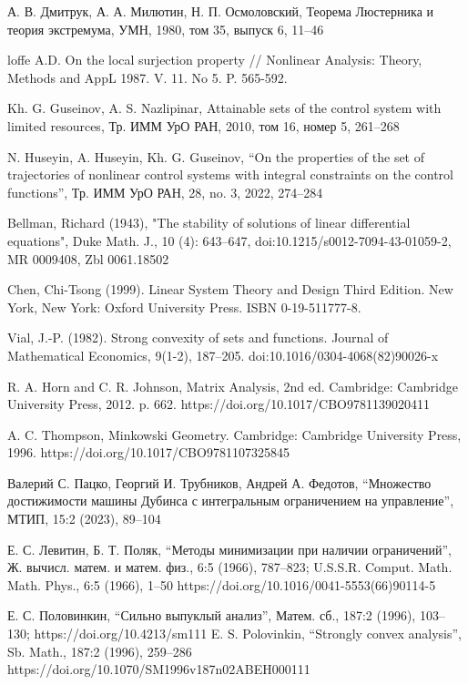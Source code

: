 \documentclass[../main.tex]{subfiles}
\begin{document}
\begin{thebibliography}{99}
А. В. Дмитрук, А. А. Милютин, Н. П. Осмоловский, Теорема Люстерника и теория экстремума, УМН, 1980, том 35, выпуск 6, 11–46

loffe A.D. On the local surjection property // Nonlinear Analysis: Theory, Methods and AppL 1987. V. 11. No 5. P. 565-592.

Kh. G. Guseinov, A. S. Nazlipinar, Attainable sets of the control system with limited resources, Тр. ИММ УрО РАН, 2010, том 16, номер 5, 261–268

N. Huseyin, A. Huseyin, Kh. G. Guseinov, “On the properties of the set of trajectories of nonlinear control systems with integral constraints on the control functions”, Тр. ИММ УрО РАН, 28, no. 3, 2022, 274–284

 Bellman, Richard (1943), "The stability of solutions of linear differential equations", Duke Math. J., 10 (4): 643–647, doi:10.1215/s0012-7094-43-01059-2, MR 0009408, Zbl 0061.18502
 
Chen, Chi-Tsong (1999). Linear System Theory and Design Third Edition. New York, New York: Oxford University Press. ISBN 0-19-511777-8.

Vial, J.-P. (1982). Strong convexity of sets and functions. Journal of Mathematical Economics, 9(1-2), 187–205. doi:10.1016/0304-4068(82)90026-x

 R. A. Horn and C. R. Johnson, Matrix Analysis, 2nd ed. Cambridge: Cambridge University Press, 2012. p. 662. https://doi.org/10.1017/CBO9781139020411
 
 A. C. Thompson, Minkowski Geometry. Cambridge: Cambridge University Press, 1996. 
 https://doi.org/10.1017/CBO9781107325845
 
 Валерий С. Пацко, Георгий И. Трубников, Андрей А. Федотов, “Множество достижимости машины Дубинса с интегральным ограничением на управление”, МТИП, 15:2 (2023), 89–104

Е. С. Левитин, Б. Т. Поляк, “Методы минимизации при наличии ограничений”, Ж. вычисл. матем. и матем. физ., 6:5 (1966), 787–823; U.S.S.R. Comput. Math. Math. Phys., 6:5 (1966), 1–50 https://doi.org/10.1016/0041-5553(66)90114-5

Е. С. Половинкин, “Сильно выпуклый анализ”, Матем. сб., 187:2 (1996), 103–130;  https://doi.org/10.4213/sm111 
E. S. Polovinkin, “Strongly convex analysis”, Sb. Math., 187:2 (1996), 259–286 https://doi.org/10.1070/SM1996v187n02ABEH000111


\end{thebibliography}
\end{document}

